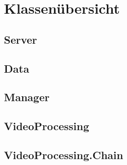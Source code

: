 \newpage
\section{Klassenübersicht}

\subsection{Server}

\newpage


\newpage

\subsection{Data}

\newpage


\newpage


\newpage


\newpage


\newpage

\subsection{Manager}

\newpage


\newpage

\subsection{VideoProcessing}

\newpage


\newpage


\newpage


\newpage

\subsection{VideoProcessing.Chain}


\newpage

